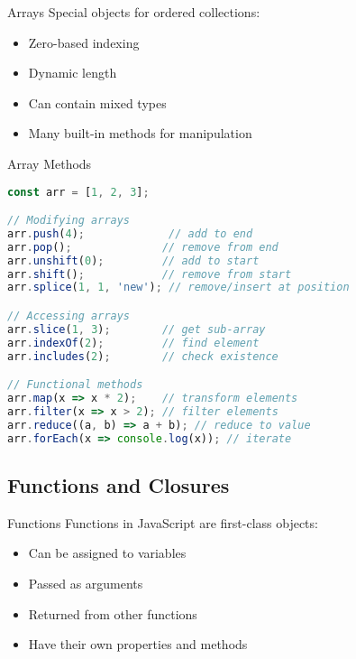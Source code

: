 \begin{concept}{Arrays}
    Special objects for ordered collections:
    \begin{itemize}
        \item Zero-based indexing
        \item Dynamic length
        \item Can contain mixed types
        \item Many built-in methods for manipulation
    \end{itemize}
\end{concept}

\begin{KR}{Array Methods}
\begin{lstlisting}[language=JavaScript, style=basesmol]
const arr = [1, 2, 3];

// Modifying arrays
arr.push(4);             // add to end
arr.pop();              // remove from end
arr.unshift(0);         // add to start
arr.shift();            // remove from start
arr.splice(1, 1, 'new'); // remove/insert at position

// Accessing arrays
arr.slice(1, 3);        // get sub-array
arr.indexOf(2);         // find element
arr.includes(2);        // check existence

// Functional methods
arr.map(x => x * 2);    // transform elements
arr.filter(x => x > 2); // filter elements
arr.reduce((a, b) => a + b); // reduce to value
arr.forEach(x => console.log(x)); // iterate
\end{lstlisting}
\end{KR}

\subsection{Functions and Closures}

\begin{concept}{Functions}
    Functions in JavaScript are first-class objects:
    \begin{itemize}
        \item Can be assigned to variables
        \item Passed as arguments
        \item Returned from other functions
        \item Have their own properties and methods
    \end{itemize}
\end{concept}


